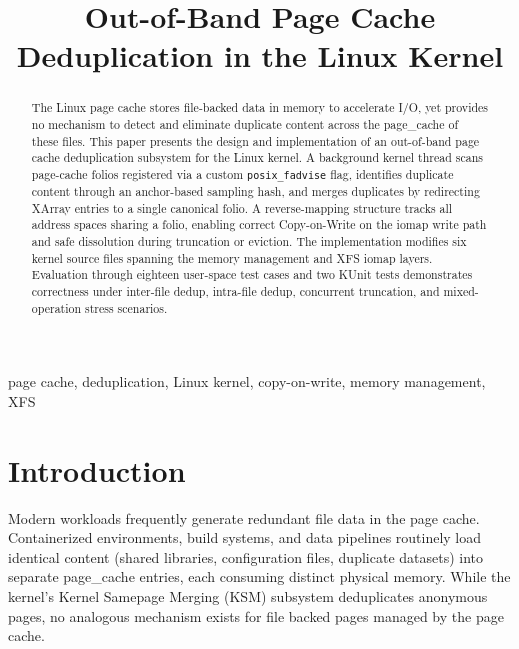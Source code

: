 \documentclass[conference]{IEEEtran}
\begin{document}
\title{Out-of-Band Page Cache Deduplication in the Linux Kernel}

\author{
}

\maketitle

\begin{abstract}
The Linux page cache stores file-backed data in memory to accelerate I/O, yet provides no mechanism to detect and eliminate duplicate content across the page\_cache of these files. This paper presents the design and implementation of an out-of-band page cache deduplication subsystem for the Linux kernel. A background kernel thread scans page-cache folios registered via a custom \texttt{posix\_fadvise} flag, identifies duplicate content through an anchor-based sampling hash, and merges duplicates by redirecting XArray entries to a single canonical folio. A reverse-mapping structure tracks all address spaces sharing a folio, enabling correct Copy-on-Write on the iomap write path and safe dissolution during truncation or eviction. The implementation modifies six kernel source files spanning the memory management and XFS iomap layers. Evaluation through eighteen user-space test cases and two KUnit tests demonstrates correctness under inter-file dedup, intra-file dedup, concurrent truncation, and mixed-operation stress scenarios.
\end{abstract}

\begin{IEEEkeywords}
page cache, deduplication, Linux kernel, copy-on-write, memory management, XFS
\end{IEEEkeywords}

\section{Introduction}

Modern workloads frequently generate redundant file data in the page cache. Containerized environments, build systems, and data pipelines routinely load identical content (shared libraries, configuration files, duplicate datasets) into separate page\_cache entries, each consuming distinct physical memory. While the kernel's Kernel Samepage Merging (KSM) \cite{b1} subsystem deduplicates anonymous pages, no analogous mechanism exists for file backed pages managed by the page cache.
\end{document}
